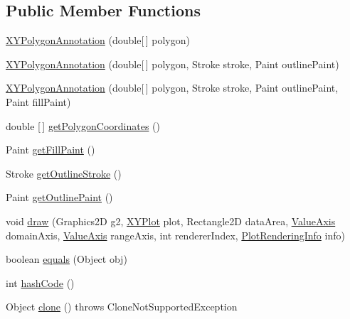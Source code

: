 \subsection*{Public Member Functions}
\begin{DoxyCompactItemize}
\item 
\mbox{\hyperlink{classorg_1_1jfree_1_1chart_1_1annotations_1_1_x_y_polygon_annotation_a4cf88109e32f06cfa5190a17f0abf857}{X\+Y\+Polygon\+Annotation}} (double\mbox{[}$\,$\mbox{]} polygon)
\item 
\mbox{\hyperlink{classorg_1_1jfree_1_1chart_1_1annotations_1_1_x_y_polygon_annotation_ad540134bd6cd46d716729c5d5a8aa7d5}{X\+Y\+Polygon\+Annotation}} (double\mbox{[}$\,$\mbox{]} polygon, Stroke stroke, Paint outline\+Paint)
\item 
\mbox{\hyperlink{classorg_1_1jfree_1_1chart_1_1annotations_1_1_x_y_polygon_annotation_a1e9db28cdc077f202b47b2709654243c}{X\+Y\+Polygon\+Annotation}} (double\mbox{[}$\,$\mbox{]} polygon, Stroke stroke, Paint outline\+Paint, Paint fill\+Paint)
\item 
double \mbox{[}$\,$\mbox{]} \mbox{\hyperlink{classorg_1_1jfree_1_1chart_1_1annotations_1_1_x_y_polygon_annotation_a280f24e4688cdcfeb390728028f204c4}{get\+Polygon\+Coordinates}} ()
\item 
Paint \mbox{\hyperlink{classorg_1_1jfree_1_1chart_1_1annotations_1_1_x_y_polygon_annotation_a5a99d293a247492f22cbd271e91c68ca}{get\+Fill\+Paint}} ()
\item 
Stroke \mbox{\hyperlink{classorg_1_1jfree_1_1chart_1_1annotations_1_1_x_y_polygon_annotation_a0ab43924e65986266c76f3acb5e2ed4a}{get\+Outline\+Stroke}} ()
\item 
Paint \mbox{\hyperlink{classorg_1_1jfree_1_1chart_1_1annotations_1_1_x_y_polygon_annotation_ab9ae72f0569ab5b292472b54aa0b0ae1}{get\+Outline\+Paint}} ()
\item 
void \mbox{\hyperlink{classorg_1_1jfree_1_1chart_1_1annotations_1_1_x_y_polygon_annotation_a5401820a121a775d9477757517bab975}{draw}} (Graphics2D g2, \mbox{\hyperlink{classorg_1_1jfree_1_1chart_1_1plot_1_1_x_y_plot}{X\+Y\+Plot}} plot, Rectangle2D data\+Area, \mbox{\hyperlink{classorg_1_1jfree_1_1chart_1_1axis_1_1_value_axis}{Value\+Axis}} domain\+Axis, \mbox{\hyperlink{classorg_1_1jfree_1_1chart_1_1axis_1_1_value_axis}{Value\+Axis}} range\+Axis, int renderer\+Index, \mbox{\hyperlink{classorg_1_1jfree_1_1chart_1_1plot_1_1_plot_rendering_info}{Plot\+Rendering\+Info}} info)
\item 
boolean \mbox{\hyperlink{classorg_1_1jfree_1_1chart_1_1annotations_1_1_x_y_polygon_annotation_a6d85a563700cbffb9dd6e154857a924e}{equals}} (Object obj)
\item 
int \mbox{\hyperlink{classorg_1_1jfree_1_1chart_1_1annotations_1_1_x_y_polygon_annotation_a3b5b07070db324165da5b05b417262de}{hash\+Code}} ()
\item 
Object \mbox{\hyperlink{classorg_1_1jfree_1_1chart_1_1annotations_1_1_x_y_polygon_annotation_a5f1c761227ab9bd1d922d50c3af7e2a6}{clone}} ()  throws Clone\+Not\+Supported\+Exception 
\end{DoxyCompactItemize}
